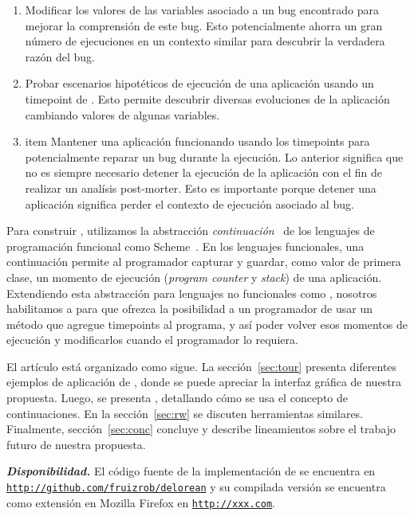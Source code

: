 \documentclass[conference]{IEEEtran}
\begin{document}
\begin{enumerate}
	
	\item Modificar los valores de las variables asociado a un bug encontrado para mejorar la comprensi\'on de este bug. Esto potencialmente ahorra un gran n\'umero de ejecuciones en un contexto similar para descubrir la verdadera raz\'on del bug.
	    

	\item Probar escenarios hipot\'eticos de ejecuci\'on de una aplicaci\'on usando un timepoint de \deloreanjs. Esto permite descubrir diversas evoluciones de la aplicaci\'on cambiando valores de algunas variables.   
	 
	\item item Mantener una aplicaci\'on funcionando usando los timepoints para potencialmente reparar un bug durante la ejecuci\'on. Lo anterior significa que no es siempre necesario detener la ejecuci\'on de la aplicaci\'on con el fin de realizar un anal\'isis post-morter. Esto es importante porque detener una aplicaci\'on significa perder el contexto de ejecuci\'on asociado al bug.  

\end{enumerate}


Para construir \deloreanjs, utilizamos la abstracci\'on {\em continuaci\'on}~\cite{fw84} de los lenguajes de programaci\'on funcional como Scheme~\cite{scheme48}. En los lenguajes funcionales, una continuaci\'on permite al programador capturar y guardar, como valor de primera clase, un momento de ejecuci\'on ({\em program counter} y {\em stack}) de una aplicaci\'on. Extendiendo esta abstracci\'on para lenguajes no funcionales como \javascript, nosotros habilitamos a \deloreanjs para que ofrezca la posibilidad a un programador de usar un m\'etodo que agregue timepoints al programa, y as\'i poder volver esos momentos de ejecuci\'on y modificarlos cuando el programador lo requiera.   


El art\'iculo est\'a organizado como sigue. La secci\'on~\ref{sec:tour} presenta diferentes ejemplos de aplicaci\'on de \deloreanjs, donde se puede apreciar la interfaz gr\'afica de nuestra propuesta. Luego, se presenta \deloreanjs, detallando c\'omo se usa el concepto de continuaciones. En la secci\'on~\ref{sec:rw} se discuten herramientas similares. Finalmente, secci\'on~\ref{sec:conc} concluye y describe lineamientos sobre el trabajo futuro de nuestra propuesta.      

\smallskip

{\bf {\em Disponibilidad.}} El c\'odigo fuente de la implementaci\'on de \deloreanjs se encuentra en {\tt \url{http://github.com/fruizrob/delorean}} y su compilada versi\'on se encuentra como extensi\'on en Mozilla Firefox en {\tt \url{http://xxx.com}}. 
\end{document}
